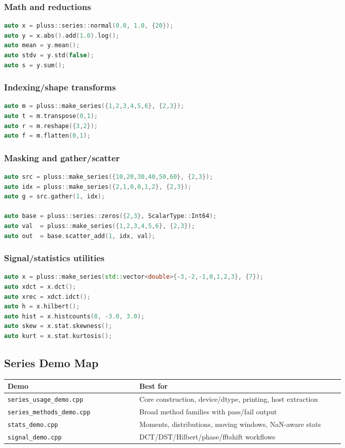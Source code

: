 \documentclass[11pt]{article}
\begin{document}
\subsubsection{Math and reductions}
\begin{lstlisting}[language=C++]
auto x = pluss::series::normal(0.0, 1.0, {20});
auto y = x.abs().add(1.0).log();
auto mean = y.mean();
auto stdv = y.std(false);
auto s = y.sum();
\end{lstlisting}

\subsubsection{Indexing/shape transforms}
\begin{lstlisting}[language=C++]
auto m = pluss::make_series({1,2,3,4,5,6}, {2,3});
auto t = m.transpose(0,1);
auto r = m.reshape({3,2});
auto f = m.flatten(0,1);
\end{lstlisting}

\subsubsection{Masking and gather/scatter}
\begin{lstlisting}[language=C++]
auto src = pluss::make_series({10,20,30,40,50,60}, {2,3});
auto idx = pluss::make_series({2,1,0,0,1,2}, {2,3});
auto g = src.gather(1, idx);

auto base = pluss::series::zeros({2,3}, ScalarType::Int64);
auto val  = pluss::make_series({1,2,3,4,5,6}, {2,3});
auto out  = base.scatter_add(1, idx, val);
\end{lstlisting}

\subsubsection{Signal/statistics utilities}
\begin{lstlisting}[language=C++]
auto x = pluss::make_series(std::vector<double>{-3,-2,-1,0,1,2,3}, {7});
auto xdct = x.dct();
auto xrec = xdct.idct();
auto h = x.hilbert();
auto hist = x.histcounts(8, -3.0, 3.0);
auto skew = x.stat.skewness();
auto kurt = x.stat.kurtosis();
\end{lstlisting}

\subsection{Series Demo Map}
\begin{longtable}{@{}p{0.36\linewidth}p{0.56\linewidth}@{}}
\textbf{Demo} & \textbf{Best for} \\
\hline
\texttt{series\_usage\_demo.cpp} & Core construction, device/dtype, printing, host extraction \\
\texttt{series\_methods\_demo.cpp} & Broad method families with pass/fail output \\
\texttt{stats\_demo.cpp} & Moments, distributions, moving windows, NaN-aware stats \\
\texttt{signal\_demo.cpp} & DCT/DST/Hilbert/phase/fftshift workflows \\
\end{longtable}
\end{document}
